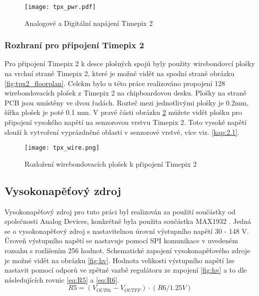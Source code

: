 	\begin{figure}[h!]
		\centering
		\captionsetup{justification=centering}
		\texttt{[image: tpx\_pwr.pdf]}
		\caption{Analogové a Digitální napájení Timepix 2} 
		\label{fig:tpx_pwr}
	\end{figure} 
	
	\subsubsection{Rozhraní pro připojení Timepix 2}	%
	Pro připojení Timepix 2 k desce plošných spojů byly použity wirebondovcí plošky na vrchní straně Timepix 2, které je možné vidět na spodní straně obrázku \ref{fig:tpx2_floorplan}. Celekm bylo u této práce realizováno propojení 128 wirebondovacích plošek z Timepix 2 na chipboardovou desku. Plošky na straně PCB jsou umístěny ve dvou řadách. Rozteč mezi jednotlivými plošky je 0.2mm, šířka plošek je poté 0.1 mm. V pravé části obrázku \ref{fig:tpx_wire} můžete vidět plošku pro připojení vysokého napětí na senzorovou vrstvu Timepix 2. Toto vysoké napětí slouží k vytvoření vyprázdněné oblasti v senzorové vrstvě, více viz. \ref{kap:2.1}. 
	\begin{figure}[h!]
		\centering
		\captionsetup{justification=centering}
		\texttt{[image: tpx\_wire.png]}
		\caption{Rozložení wirebondovacích plošek k připojení Timepix 2} 
		\label{fig:tpx_wire}
	\end{figure} 
	
		
	\subsection{Vysokonapěťový zdroj}	%
	\label{VN zdroj}
	Vysokonapěťový zdroj pro tuto práci byl realizován za použití součástky od společnosti Analog Devices, konkrétně byla použita součástka MAX1932 \cite{MAX1932}. Jedná se o vysokonapěťový zdroj s nastavitelnou úrovní výstupního napětí 30 - 148 V. Úroveň výstupního napětí se nastavuje pomocí SPI komunikace v uvedeném rozsahu s rozlišením 256 hodnot. Schematické zapojení vysokonapěťového zdroje je možné vidět na obrázku \ref{fig:hv}. Hodnota velikosti výstupního napětí lze nastavit pomocí odporů ve zpětné vazbě regulátoru ze zapojení \ref{fig:hv} a to dle následujících rovnic \ref{eq:R5} a \ref{eq:R6}. 
	\begin{equation}
		R5 = (V_{OUT01} - V_{OUTFF})\cdot (R6/1.25V)
		\label{eq:R5}
	\end{equation}

